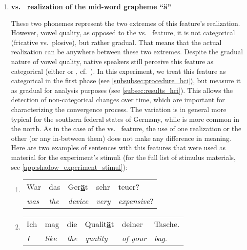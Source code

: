 \begin{enumerate}
	\item \textbf{\textipa{[e:]} vs.\ \textipa{[E:]} realization of the mid-word grapheme \enquote{ä}}
	
	These two phonemes represent the two extremes of this feature's realization.
	However, vowel quality, as opposed to the \textipa{[\c{c}]} vs.\ \textipa{[k]} feature, it is not categorical (fricative vs.\ plosive), but rather gradual.
	That means that the actual realization can be anywhere between these two extremes.
	Despite the gradual nature of vowel quality, native speakers still perceive this feature as categorical (either \textipa{[e]} or \textipa{[E]}, cf.\ \citet{Kuhl2004early, Kuhl1991human}).
	In this experiment, we treat this feature as categorical in the first phase (see \cref{subsubsec:procedure_hci}), but measure it as gradual for analysis purposes (see \cref{subsec:results_hci}).
	This allows the detection of non-categorical changes over time, which are important for characterizing the convergence process.
	The \textipa{[E]} variation is in general more typical for the southern federal states of Germany, while \textipa{[e]} is more common in the north.
	As in the case of the \textipa{[\c{c}]} vs.\ \textipa{[k]} feature, the use of one realization or the other (or any in-between them) does not make any difference in meaning.
	Here are two examples of sentences with this features that were used as material for the experiment's stimuli (for the full list of stimulus materials, see \autoref{app:shadow_experiment_stimul}):
	
	\begin{enumerate}[label=\arabic{enumi}\alph*), ref=\arabic{enumi}\alph*.)]
		\item 
		\begin{tabulary}{\linewidth}{LLLLL}
			War 		 & das 			& Ger\textbf{\underline{ä}}t & sehr			 & teuer?\\
			\textit{was} & \textit{the} & \textit{device}			 & \textit{very} & \textit{expensive}?\\
		\end{tabulary}
		\item
		\begin{tabulary}{\linewidth}{LLLLLL}
			Ich		   & mag 			& die 			& Qualit\textbf{\underline{ä}}t & deiner		   & Tasche.\\
			\textit{I} & \textit{like}  & \textit{the}  & \textit{quality} 				& \textit{of your} & \textit{bag}.\\
		\end{tabulary}
	\end{enumerate}
	

\end{enumerate}
